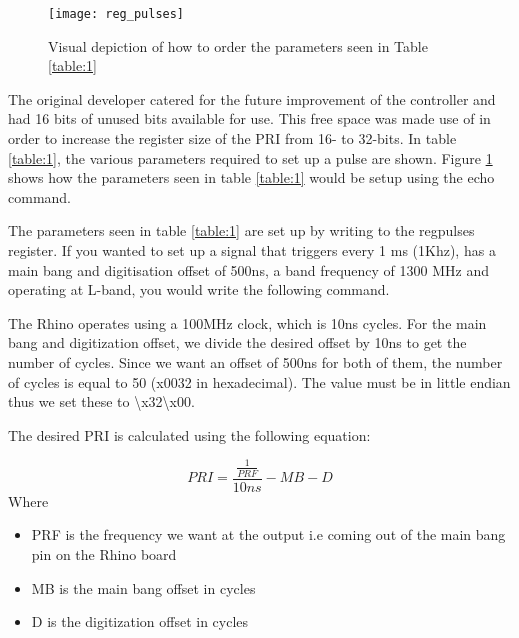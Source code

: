 \documentclass[12pt, a4paper]{article}
\begin{document}
	\begin{figure}
		\centering
		\texttt{[image: reg\_pulses]}
		\caption{Visual depiction of how to order the parameters seen in Table \ref{table:1}}
		\label{fig:reg_pulses}
	\end{figure}



The original developer catered for the future improvement of the controller and had 16 bits of unused bits available for use. This free space was made use of in order to increase the register size of the PRI from 16- to 32-bits. In table \ref{table:1}, the various parameters required to set up a pulse are shown. Figure \ref{fig:reg_pulses} shows how the parameters seen in table \ref{table:1} would be setup using the echo command.


The parameters seen in table \ref{table:1} are set up by writing to the reg\textunderscore pulses register. If you wanted to set up a signal that triggers every 1 ms (1Khz), has a main bang and digitisation offset of 500ns, a band frequency of 1300 MHz and operating at L-band, you would write the following command. 




The Rhino operates using a 100MHz clock, which is 10ns cycles. For the main bang and digitization offset, we divide the desired offset by 10ns to get the number of cycles. Since we want an offset of 500ns for both of them, the number of cycles is equal to 50 (x0032 in hexadecimal). The value must be in little endian thus we set these to \textbackslash x32\textbackslash x00. 


The desired PRI is calculated using the following equation:

	\[ 
		PRI = \frac{\frac{1}{PRF}}{10ns} - MB - D
	\]
Where
 
	\begin{itemize}
  		\item PRF is the frequency we want at the output i.e coming out of the main bang pin on the Rhino board
  		\item MB is the main bang offset in cycles
  		\item D is the digitization offset in cycles
	\end{itemize}
\end{document}
